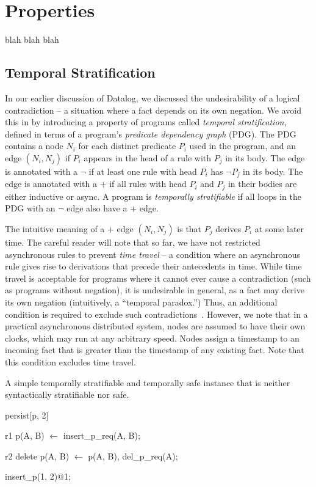\section{Properties}

blah blah blah

\subsection{Temporal Stratification}

In our earlier discussion of Datalog, we discussed the undesirability of a logical contradiction -- a situation where a fact depends on its own negation.  We avoid this in \lang by introducing a property of programs called {\em temporal stratification}, defined in terms of a program's {\em predicate dependency graph} (PDG).  The PDG contains a node $N_i$ for each distinct predicate $P_i$ used in the program, and an edge $(N_i, N_j)$ if $P_i$ appears in the head of a rule with $P_j$ in its body.  The edge is annotated with a $\lnot$ if at least one rule with head $P_i$ has $\lnot P_j$ in its body.  The edge is annotated with a $+$ if all rules with head $P_i$ and $P_j$ in their bodies are either inductive or async.  A \lang program is {\em temporally stratifiable} if all loops in the PDG with an $\lnot$ edge also have a $+$ edge.

The intuitive meaning of a $+$ edge $(N_i, N_j)$ is that $P_j$ derives $P_i$ at some later time.  The careful reader will note that so far, we have not restricted asynchronous rules to prevent {\em time travel} -- a condition where an asynchronous rule gives rise to derivations that precede their antecedents in time.  While time travel is acceptable for programs where it cannot ever cause a contradiction (such as programs without negation), it is undesirable in general, as a fact may derive its own negation (intuitively, a ``temporal paradox.'')  Thus, an additional condition is required to exclude such contradictions~.  However, we note that in a practical asynchronous distributed system, nodes are assumed to have their own clocks, which may run at any arbitrary speed.  Nodes assign a timestamp to an incoming fact that is greater than the timestamp of any existing fact.  Note that  this condition excludes time travel.

\begin{example}
\label{ex:stratsafe}
A simple temporally stratifiable and temporally safe \slang instance that is neither syntactically stratifiable nor safe.

\begin{Dedalus}
persist[p, 2]  
  
r1
p(A, B) \(\leftarrow\)
  insert\_p\_req(A, B);

r2  
delete p(A, B) \(\leftarrow\)
  p(A, B),
  del\_p\_req(A);

insert\_p(1, 2)@1;
\end{Dedalus}
\end{example}

